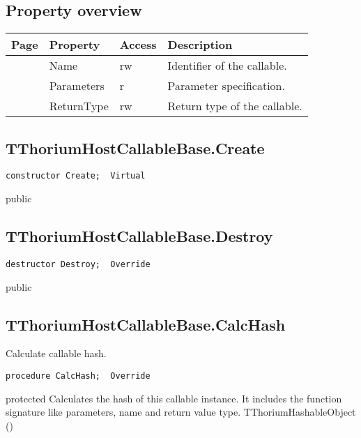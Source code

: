 \subsection{Property overview}
\label{thoriumcorepkg:thorium:tthoriumhostcallablebase:properties}
\begin{tabularx}{\textwidth}{lllX}
Page & Property & Access & Description \\ \hline
\pageref{thoriumcorepkg:thorium:tthoriumhostcallablebase:name} & Name & rw & Identifier of the callable. \\
\pageref{thoriumcorepkg:thorium:tthoriumhostcallablebase:parameters} & Parameters & r & Parameter specification. \\
\pageref{thoriumcorepkg:thorium:tthoriumhostcallablebase:returntype} & ReturnType & rw & Return type of the callable. \\
\hline
\end{tabularx}
\subsection{TThoriumHostCallableBase.Create}
\label{thoriumcorepkg:thorium:tthoriumhostcallablebase:create}
\begin{FPCList}
\Declaration 

\begin{verbatim}
constructor Create;  Virtual
\end{verbatim}
\Visibility
public
\end{FPCList}
\subsection{TThoriumHostCallableBase.Destroy}
\label{thoriumcorepkg:thorium:tthoriumhostcallablebase:destroy}
\begin{FPCList}
\Declaration 

\begin{verbatim}
destructor Destroy;  Override
\end{verbatim}
\Visibility
public
\end{FPCList}
\subsection{TThoriumHostCallableBase.CalcHash}
\label{thoriumcorepkg:thorium:tthoriumhostcallablebase:calchash}
\begin{FPCList}
\Synopsis
Calculate callable hash.\Declaration 

\begin{verbatim}
procedure CalcHash;  Override
\end{verbatim}
\Visibility
protected
\Description
Calculates the hash of this callable instance. It includes the function signature like parameters, name and return value type.\SeeAlso
TThoriumHashableObject (\pageref{thoriumcorepkg:thorium:tthoriumhashableobject})\end{FPCList}
